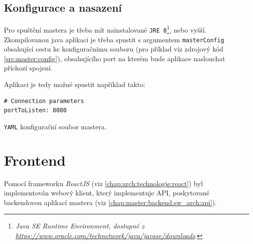 \subsection{Konfigurace a nasazení}
Pro spuštění mastera je třeba mít nainstalované \texttt{JRE 8}\footnote{\textit{Java SE Runtime Environment, dostupné z\\\url{https://www.oracle.com/technetwork/java/javase/downloads}}.}, nebo vyšší.
Zkompilovanou java aplikaci je třeba spustit s argumentem \texttt{masterConfig} obsahující cestu ke konfiguračnímu souboru (pro příklad viz zdrojový kód \ref{src:master:config}), obsahujícího port na kterém bude aplikace naslouchat příchozí spojení.

Aplikaci je tedy možné spustit například takto: 

\begin{code}[h]
  \begin{verbatim}
# Connection parameters
portToListen: 8080
\end{verbatim}
\caption{\texttt{YAML} konfigurační soubor mastera.}
\label{src:master:config}
\end{code}

\section{Frontend}\label{chap:master:frontend}
Pomocí frameworku \textit{ReactJS} (viz \ref{chap:arch:technologie:react}) byl implementován webový klient, který implementuje API, poskytované backendovou aplikací mastera (viz \ref{chap:master:backend:sw_arch:api}). 

